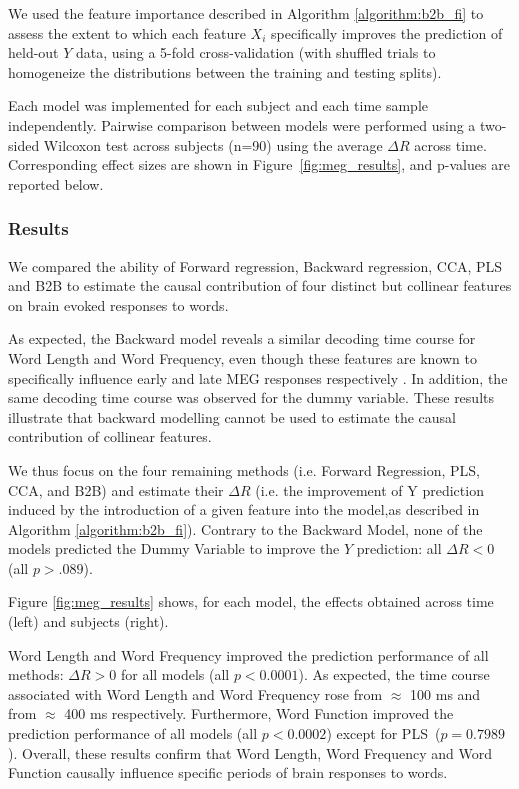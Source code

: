 We used the feature importance described in Algorithm \ref{algorithm:b2b_fi} to assess the extent to which each feature $X_i$ specifically improves the prediction of held-out $Y$ data, using a 5-fold cross-validation (with shuffled trials to homogeneize the distributions between the training and testing splits).

Each model was implemented for each subject and each time sample independently. Pairwise comparison between models were performed using a two-sided Wilcoxon test across subjects (n=90) using the average $\Delta R$ across time. Corresponding effect sizes are shown in Figure~\ref{fig:meg_results}, and p-values are reported below.


\subsubsection{Results}
We compared the ability of Forward regression, Backward regression, CCA, PLS and B2B to estimate the causal contribution of four distinct but collinear features on brain evoked responses to words.

As expected, the Backward model reveals a similar decoding time course for Word Length and Word Frequency, even though these features are known to specifically influence early and late MEG responses respectively \citep{kutas2011thirty}. In addition, the same decoding time course was observed for the dummy variable. These results illustrate that backward modelling cannot be used to estimate the causal contribution of collinear features.

We thus focus on the four remaining methods (i.e. Forward Regression, PLS, CCA, and B2B) and estimate their $\Delta R$ (i.e. the improvement of Y prediction induced by the introduction of a given feature into the model,as described in Algorithm \ref{algorithm:b2b_fi}). Contrary to the Backward Model, none of the models predicted the Dummy Variable to improve the $Y$ prediction: all $\Delta R < 0$ (all $p > .089$).

Figure \ref{fig:meg_results} shows, for each model, the effects obtained across time (left) and subjects (right).

Word Length and Word Frequency improved the prediction performance of all methods: $\Delta R>0$ for all models (all $p<0.0001$). As expected, the time course associated with Word Length and Word Frequency rose from $\approx$ 100 ms and from $\approx$ 400 ms respectively. Furthermore, Word Function improved the prediction performance of all models (all $p < 0.0002$) except for PLS~($p=0.7989$). Overall, these results confirm that Word Length, Word Frequency and Word Function causally influence specific periods of brain responses to words.

